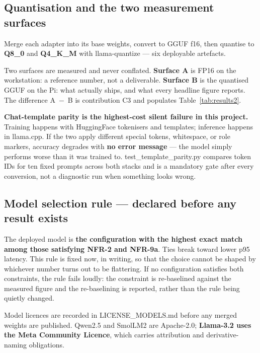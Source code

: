 \documentclass[11pt,a4paper]{article}
\newcommand{\code}[1]{{\ttfamily\small #1}}
\newenvironment{panel}
  {\par\begin{center}\begin{lrbox}{\panelbox}\begin{minipage}{0.94\textwidth}\vspace{3pt}}
  {\vspace{3pt}\end{minipage}\end{lrbox}%
   \fcolorbox{rulegray}{panelbg}{\usebox{\panelbox}}\end{center}\par}
\begin{document}
\subsection{Quantisation and the two measurement surfaces}

Merge each adapter into its base weights, convert to GGUF f16, then quantise to \textbf{Q8\_0} and
\textbf{Q4\_K\_M} with \code{llama-quantize} --- six deployable artefacts.

Two surfaces are measured and never conflated. \textbf{Surface A} is FP16 on the workstation: a reference
number, not a deliverable. \textbf{Surface B} is the quantised GGUF on the Pi: what actually ships, and
what every headline figure reports. The difference A~$-$~B is contribution C3 and populates
Table~\ref{tab:results2}.

\begin{panel}
\textbf{Chat-template parity is the highest-cost silent failure in this project.} Training happens with
HuggingFace tokenisers and templates; inference happens in \code{llama.cpp}. If the two apply different
special tokens, whitespace, or role markers, accuracy degrades with \textbf{no error message} --- the
model simply performs worse than it was trained to. \code{test\_template\_parity.py} compares token IDs
for ten fixed prompts across both stacks and is a mandatory gate after every conversion, not a diagnostic
run when something looks wrong.
\end{panel}

\subsection{Model selection rule --- declared before any result exists}

The deployed model is \textbf{the configuration with the highest exact match among those satisfying NFR-2
and NFR-9a}. Ties break toward lower p95 latency. This rule is fixed now, in writing, so that the choice
cannot be shaped by whichever number turns out to be flattering. If no configuration satisfies both
constraints, the rule fails loudly: the constraint is re-baselined against the measured figure and the
re-baselining is reported, rather than the rule being quietly changed.

Model licences are recorded in \code{LICENSE\_MODELS.md} before any merged weights are published. Qwen2.5
and SmolLM2 are Apache-2.0; \textbf{Llama-3.2 uses the Meta Community Licence}, which carries attribution
and derivative-naming obligations.
\end{document}
